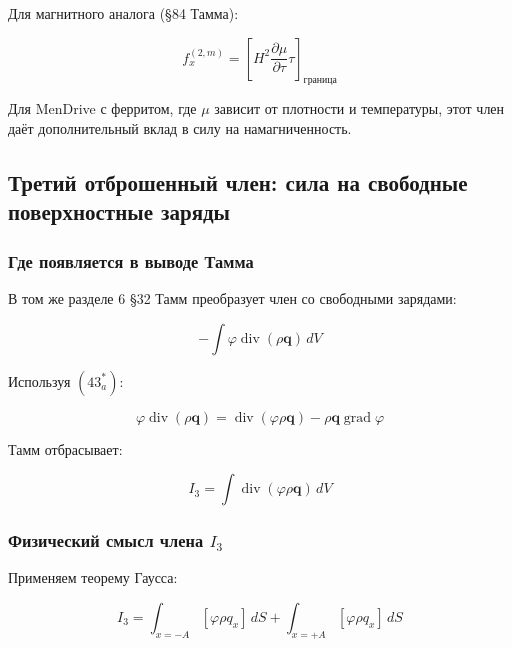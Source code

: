 \documentclass[a4paper,12pt]{article}
\begin{document}
Для магнитного аналога (§84 Тамма):

\begin{equation}
f_x^{(2,m)} = \left[H^2\frac{\partial\mu}{\partial\tau}\tau\right]_{\text{граница}}
\label{eq:force_term_2_magnetic}
\end{equation}

Для MenDrive с ферритом, где $\mu$ зависит от плотности и температуры,
этот член даёт дополнительный вклад в силу на намагниченность.

\subsection{Третий отброшенный член: сила на свободные поверхностные заряды}

\subsubsection{Где появляется в выводе Тамма}

В том же разделе 6 §32 Тамм преобразует член со свободными зарядами:

\begin{equation}
-\int \varphi\operatorname{div}(\rho\mathbf{q})\,dV
\label{eq:tamm_integral_3}
\end{equation}

Используя $(43^*_a)$:

\begin{equation}
\varphi\operatorname{div}(\rho\mathbf{q}) =
\operatorname{div}(\varphi\rho\mathbf{q}) -
\rho\mathbf{q}\operatorname{grad}\varphi
\label{eq:divergence_identity_3}
\end{equation}

Тамм отбрасывает:

\begin{equation}
\boxed{
I_3 = \int \operatorname{div}(\varphi\rho\mathbf{q})\,dV
}
\label{eq:discarded_term_3}
\end{equation}

\subsubsection{Физический смысл члена $I_3$}

Применяем теорему Гаусса:

\begin{equation}
I_3 = \int_{x=-A} [\varphi\rho q_x]\,dS + \int_{x=+A} [\varphi\rho q_x]\,dS
\label{eq:term_3_gauss}
\end{equation}
\end{document}
